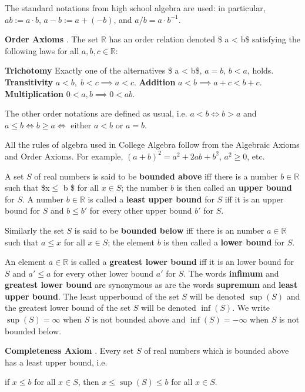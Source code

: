 \documentclass[10pt,a4paper,UTF8]{article}
\begin{document}
The standard notations from high school algebra are used:
 in particular, \(ab:=a\cdot b\), \(a-b:=a+(-b)\), and \(a/b=a\cdot b^{-1}\).


\textbf{Order Axioms} .   The set \(\mathbb{R}\) has an order relation
denoted \$ a < b\$ satisfying the following laws for all \(a,b,c\in\mathbb{R}\):

\textbf{Trichotomy}   Exactly one of the alternatives    \$ a < b\$, \(a=b\), \(b < a\), holds.
\textbf{Transitivity}    \(a < b,\;b < c\implies a < c\).
\textbf{Addition}    \(a < b\implies a+c < b+c\).
\textbf{Multiplication}     \(0 < a,b\implies 0 < ab\).

The other order notations are defined as usual, i.e.
\(a < b\iff b>a\) and \(a\le b\iff b\ge a\iff\) either \(a < b\) or \(a=b\).


All the rules of algebra used in College Algebra
 follow from the Algebraic Axioms and Order Axioms.
For example, \((a+b)^2=a^2+2ab+b^2\), \(a^2\ge 0\), etc.


A set \(S\)  of real numbers is said to be \textbf{bounded above} iff there is
a  number \(b\in\mathbb{R}\) such that \$x\(\le\) b \$ for all \(x\in S\);
the number \(b\) is  then called an \textbf{upper bound}  for \(S\).
A number \(b\in\mathbb{R}\) is called a \textbf{least upper bound}  for \(S\) iff
it is an upper bound for \(S\) and
\(b\le b'\) for every other upper bound \(b'\) for \(S\).

 Similarly  the set \(S\) is said to be \textbf{bounded below}  iff there is
an number \(a\in\mathbb{R}\) such that \(a\le x\) for all \(x\in S\);
the element \(b\) is  then called a  \textbf{lower bound}  for \(S\).

An element \(a\in\mathbb{R}\) is called a \textbf{greatest lower bound}
iff it is an lower bound for \(S\) and  \(a'\le a\) for every other lower bound
\(a'\) for \(S\).  The words \textbf{infimum}  and \textbf{greatest lower bound} are synonymous
as are the   words \textbf{supremum}  and \textbf{least upper bound}.
The least upperbound of the set \(S\) will be denoted \(\sup(S)\)
and
the greatest lower bound of the set \(S\) will be denoted \(\inf(S)\).
We write \(\sup(S)=\infty\) when \(S\) is not bounded above and \(\inf(S)=-\infty\)
when \(S\) is not bounded below.


\textbf{Completeness Axiom} .
Every set \(S\) of real numbers which is bounded above has a least upper bound, i.e.

if \(x\le b\) for all \(x\in S\), then \(x\le \sup(S)\le b\) for all \(x\in S\).
\end{document}
